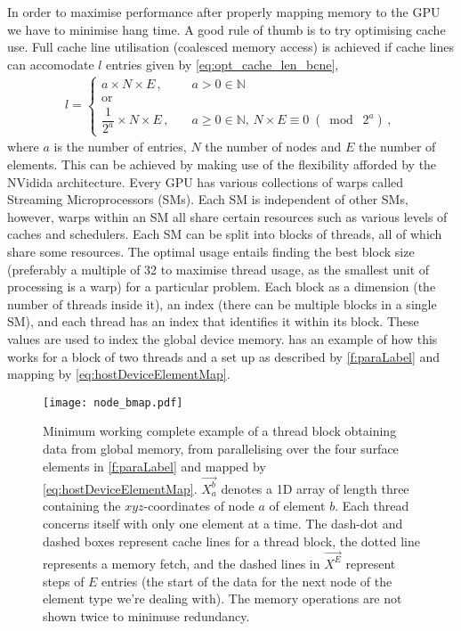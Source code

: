 In order to maximise performance after properly mapping memory to the GPU we have to minimise hang time. A good rule of thumb is to try optimising cache use. Full cache line utilisation (coalesced memory access) is achieved if cache lines can accomodate $ l $ entries given by \cref{eq:opt_cache_len_bcne},
\begin{align}
    \label{eq:opt_cache_len_bcne}
    l =
    \begin{cases}
        a \times N \times E\,,                & \quad a > 0 \in \mathbb{N}                                                \\
        \textrm{or}                                                                                                       \\
        \dfrac{1}{2^{a}} \times N \times E\,, & \quad a \geq 0 \in \mathbb{N},\, N \times E \equiv 0\; (\bmod\; 2^{a})\,,
    \end{cases}
\end{align}
where $a$ is the number of entries, $N$ the number of nodes and $E$ the number of elements. This can be achieved by making use of the flexibility afforded by the NVidida architecture. Every GPU has various collections of warps called Streaming Microprocessors (SMs). Each SM is independent of other SMs, however, warps within an SM all share certain resources such as various levels of caches and schedulers. Each SM can be split into blocks of threads, all of which share some resources. The optimal usage entails finding the best block size (preferably a multiple of 32 to maximise thread usage, as the smallest unit of processing is a warp) for a particular problem. Each block as a dimension (the number of threads inside it), an index (there can be multiple blocks in a single SM), and each thread has an index that identifies it within its block. These values are used to index the global device memory.  has an example of how this works for a block of two threads and a set up as described by \cref{f:paraLabel} and mapping by \cref{eq:hostDeviceElementMap}.
\begin{figure}
    \centering
    \texttt{[image: node\_bmap.pdf]}
    \caption[Sample parallel execution.]{Minimum working complete example of a thread block obtaining data from global memory, from parallelising over the four surface elements in \cref{f:paraLabel} and mapped by \cref{eq:hostDeviceElementMap}. $\vec{X_{a}^{b}}$ denotes a 1D array of length three containing the $ xyz $-coordinates of node $ a $ of element $ b $. Each thread concerns itself with only one element at a time. The dash-dot and dashed boxes represent cache lines for a thread block, the dotted line represents a memory fetch, and the dashed lines in $ \vec{X^{E}} $ represent steps of $ E $ entries (the start of the data for the next node of the element type we're dealing with). The memory operations are not shown twice to minimuse redundancy.}
    \label{f:parallel_exec}
\end{figure}

